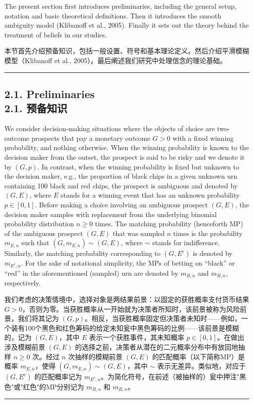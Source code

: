\documentclass[12pt,a4paper]{article}
\newenvironment{original}
  {\par\vspace{0.5em}\noindent\color{black}\ignorespaces}
  {\par\vspace{0.3em}}
\newenvironment{translation}
  {\par\noindent\color{transblue}\ignorespaces}
  {\par\vspace{0.8em}\hrule\vspace{0.5em}}
\newcommand{\bilingualsubsection}[2]{%
  \subsection{\texorpdfstring{#1 \\[0.2em] {\normalsize\color{transblue}#2}}{#1}}
}
\begin{document}
\begin{original}
The present section first introduces preliminaries, including the general setup, notation and basic theoretical definitions. Then it introduces the smooth ambiguity model (Klibanoff et al., 2005). Finally it sets out the theory behind the treatment of beliefs in our studies.
\end{original}

\begin{translation}
本节首先介绍预备知识，包括一般设置、符号和基本理论定义。然后介绍平滑模糊模型（Klibanoff et al., 2005）。最后阐述我们研究中处理信念的理论基础。
\end{translation}

\bilingualsubsection{2.1. Preliminaries}{2.1. 预备知识}

\begin{original}
We consider decision-making situations where the objects of choice are two-outcome prospects that pay a monetary outcome $G > 0$ with a fixed winning probability, and nothing otherwise. When the winning probability is known to the decision maker from the outset, the prospect is said to be risky and we denote it by $(G, p)$. In contrast, when the winning probability is fixed but unknown to the decision maker, e.g., the proportion of black chips in a given unknown urn containing 100 black and red chips, the prospect is ambiguous and denoted by $(G, E)$, where $E$ stands for a winning event that has an unknown probability $p \in [0, 1]$. Before making a choice involving an ambiguous prospect $(G, E)$, the decision maker samples with replacement from the underlying binomial probability distribution $n \geq 0$ times. The matching probability (henceforth MP) of the ambiguous prospect $(G, E)$ that was sampled $n$ times is the probability $m_{E,n}$ such that $(G, m_{E,n}) \sim (G, E)$, where $\sim$ stands for indifference. Similarly, the matching probability corresponding to $(G, E^c)$ is denoted by $m_{E^c,n}$. For the sake of notational simplicity, the MPs of betting on ``black'' or ``red'' in the aforementioned (sampled) urn are denoted by $m_{B,n}$ and $m_{R,n}$, respectively.
\end{original}

\begin{translation}
我们考虑的决策情境中，选择对象是两结果前景：以固定的获胜概率支付货币结果 $G > 0$，否则为零。当获胜概率从一开始就为决策者所知时，该前景被称为风险前景，我们将其记为 $(G, p)$。相反，当获胜概率固定但决策者未知时——例如，一个装有100个黑色和红色筹码的给定未知瓮中黑色筹码的比例——该前景是模糊的，记为 $(G, E)$，其中 $E$ 表示一个获胜事件，其未知概率 $p \in [0, 1]$。在做出涉及模糊前景 $(G, E)$ 的选择之前，决策者从潜在的二元概率分布中有放回地抽样 $n \geq 0$ 次。经过 $n$ 次抽样的模糊前景 $(G, E)$ 的匹配概率（以下简称MP）是概率 $m_{E,n}$，使得 $(G, m_{E,n}) \sim (G, E)$，其中 $\sim$ 表示无差异。类似地，对应于 $(G, E^c)$ 的匹配概率记为 $m_{E^c,n}$。为简化符号，在前述（被抽样的）瓮中押注"黑色"或"红色"的MP分别记为 $m_{B,n}$ 和 $m_{R,n}$。
\end{translation}
\end{document}
